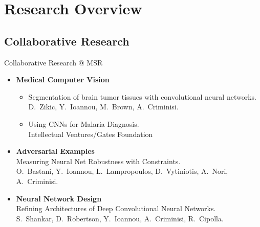 \documentclass[t,xcolor=dvipsnames]{beamer}
\begin{document}
\usebackgroundtemplate{}

\section{Research Overview}
\subsection{Collaborative Research}
\begin{frame}{Collaborative Research @ MSR}
\begin{itemize}
    \item \textbf{Medical Computer Vision}
    \begin{itemize}
        \item Segmentation of brain tumor tissues with convolutional neural networks.\\{\footnotesize D.\ Zikic, Y.\ Ioannou, M.\ Brown, A.\ Criminisi.}\\%
        \item Using CNNs for Malaria Diagnosis.\\{\footnotesize Intellectual Ventures/Gates Foundation}
    \end{itemize}
    \item \textbf{Adversarial Examples}\\Measuring Neural Net Robustness with Constraints.\\{\footnotesize O.\ Bastani, Y.\ Ioannou, L.\ Lampropoulos, D.\ Vytiniotis, A.\ Nori, A.\ Criminisi.}%
    \item \textbf{Neural Network Design}\\Refining Architectures of Deep Convolutional Neural Networks.\\{\footnotesize 
S.\ Shankar, D.\ Robertson, Y.\ Ioannou, A.\ Criminisi, R.\ Cipolla.}%
\end{itemize}
\end{frame}
\end{document}
